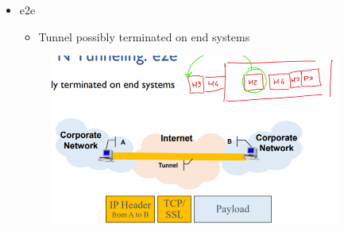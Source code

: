\documentclass{article}
\begin{document}
\begin{itemize}
\begin{itemize}
\begin{figure}[H]
        \end{figure}
        \item e2e
        \begin{itemize}
            \item Tunnel possibly terminated on end systems
        \end{itemize}
        \begin{figure}[H]
            \centering
            \includegraphics[width=0.90\textwidth]{figure/e2e_layer4.png}
        \end{figure}
    \end{itemize}
\end{itemize}
\end{document}
